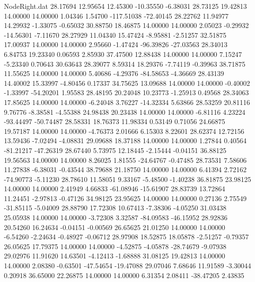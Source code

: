 \begin{filecontents}{NodeRight.dat}
  28.17694   12.95654   12.45300   -10.35550   -6.38031   28.73125   19.42813   14.00000   14.00000    1.04346    1.54700 -117.51038  -72.40145
  28.22762   11.94977   14.29932    -1.33075   -0.65032   30.88750   18.46875   14.00000   14.00000    2.05023   -0.29932  -14.56301   -7.11670
  28.27929   11.04340   15.47424    -8.95881   -2.51257   32.51875   17.00937   14.00000   14.00000    2.95660   -1.47424  -96.39826  -27.03563
  28.34013    6.84753   19.23340     0.06593    2.85930   37.47500   12.88438   14.00000   14.00000    7.15247   -5.23340    0.70643   30.63643
  28.39077    8.59314   18.29376    -7.74119   -0.39963   38.71875   11.55625   14.00000   14.00000    5.40686   -4.29376  -84.58653   -4.36669
  28.43139   14.40002   15.33997    -4.80456    0.17337   34.75625   13.09688   14.00000   14.00000   -0.40002   -1.33997  -54.20201    1.95583
  28.48195   20.24048   10.23773    -1.25913    0.49568   28.34063   17.85625   14.00000   14.00000   -6.24048    3.76227  -14.32334    5.63866
  28.53259   20.81116    9.76776    -8.38581   -4.55388   24.98438   20.23438   14.00000   14.00000   -6.81116    4.23224  -93.44497  -50.74487
  28.58331   18.76373   11.98334     0.53149    0.71056   24.66875   19.57187   14.00000   14.00000   -4.76373    2.01666    6.15303    8.22601
  28.62374   12.72156   13.59436    -7.02494   -4.08831   29.09688   18.37188   14.00000   14.00000    1.27844    0.40564  -81.21217  -47.26319
  28.67440    5.73975   12.18445    -2.15444   -0.04151   36.88125   19.56563   14.00000   14.00000    8.26025    1.81555  -24.64767   -0.47485
  28.73531    7.58606   11.27838    -6.38031   -0.43544   38.79688   21.18750   14.00000   14.00000    6.41394    2.72162  -74.90773   -5.11230
  28.78610   11.58051    9.33167    -5.48500   -1.40238   36.81875   23.98125   14.00000   14.00000    2.41949    4.66833  -61.08946  -15.61907
  28.83739   13.72864   11.24451    -2.97813   -0.47126   34.98125   23.95625   14.00000   14.00000    0.27136    2.75549  -31.85115   -5.04009
  28.88790   17.72308   10.67413    -7.38306   -4.05250   31.03438   25.05938   14.00000   14.00000   -3.72308    3.32587  -84.09583  -46.15952
  28.92836   20.54260   16.24634    -0.04151   -0.00569   26.65625   21.01250   14.00000   14.00000   -6.54260   -2.24634   -0.48927   -0.06712
  28.97908   18.52875   18.05878    -2.51257   -0.79357   26.05625   17.79375   14.00000   14.00000   -4.52875   -4.05878  -28.74679   -9.07938
  29.02976   11.91620   14.63501    -4.12413   -1.68888   31.08125   19.42813   14.00000   14.00000    2.08380   -0.63501  -47.54654  -19.47088
  29.07046    7.68646   11.91589    -3.30044    0.20918   36.65000   22.26875   14.00000   14.00000    6.31354    2.08411  -38.47205    2.43835

\end{filecontents}

